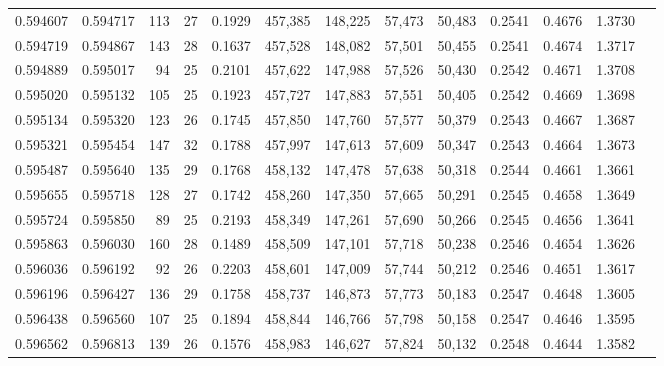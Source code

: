 \begin{tabular}{rrrrrrrrrrrrr}
0.594607 & 0.594717 &   113 &  27 &                                     0.1929 & 457,385 & 148,225 &  57,473 &  50,483 & 0.2541 & 0.4676 & 1.3730 \\
0.594719 & 0.594867 &   143 &  28 &                                     0.1637 & 457,528 & 148,082 &  57,501 &  50,455 & 0.2541 & 0.4674 & 1.3717 \\
0.594889 & 0.595017 &    94 &  25 &                                     0.2101 & 457,622 & 147,988 &  57,526 &  50,430 & 0.2542 & 0.4671 & 1.3708 \\
0.595020 & 0.595132 &   105 &  25 &                                     0.1923 & 457,727 & 147,883 &  57,551 &  50,405 & 0.2542 & 0.4669 & 1.3698 \\
0.595134 & 0.595320 &   123 &  26 &                                     0.1745 & 457,850 & 147,760 &  57,577 &  50,379 & 0.2543 & 0.4667 & 1.3687 \\
0.595321 & 0.595454 &   147 &  32 &                                     0.1788 & 457,997 & 147,613 &  57,609 &  50,347 & 0.2543 & 0.4664 & 1.3673 \\
0.595487 & 0.595640 &   135 &  29 &                                     0.1768 & 458,132 & 147,478 &  57,638 &  50,318 & 0.2544 & 0.4661 & 1.3661 \\
0.595655 & 0.595718 &   128 &  27 &                                     0.1742 & 458,260 & 147,350 &  57,665 &  50,291 & 0.2545 & 0.4658 & 1.3649 \\
0.595724 & 0.595850 &    89 &  25 &                                     0.2193 & 458,349 & 147,261 &  57,690 &  50,266 & 0.2545 & 0.4656 & 1.3641 \\
0.595863 & 0.596030 &   160 &  28 &                                     0.1489 & 458,509 & 147,101 &  57,718 &  50,238 & 0.2546 & 0.4654 & 1.3626 \\
0.596036 & 0.596192 &    92 &  26 &                                     0.2203 & 458,601 & 147,009 &  57,744 &  50,212 & 0.2546 & 0.4651 & 1.3617 \\
0.596196 & 0.596427 &   136 &  29 &                                     0.1758 & 458,737 & 146,873 &  57,773 &  50,183 & 0.2547 & 0.4648 & 1.3605 \\
0.596438 & 0.596560 &   107 &  25 &                                     0.1894 & 458,844 & 146,766 &  57,798 &  50,158 & 0.2547 & 0.4646 & 1.3595 \\
0.596562 & 0.596813 &   139 &  26 &                                     0.1576 & 458,983 & 146,627 &  57,824 &  50,132 & 0.2548 & 0.4644 & 1.3582 \\

\end{tabular}
